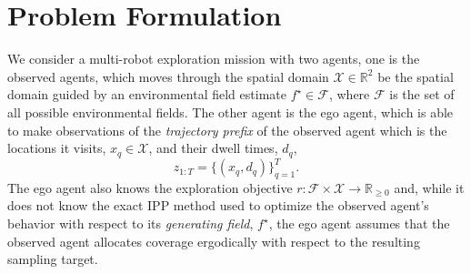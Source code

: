 \documentclass[letterpaper,10pt,conference]{ieeeconf}
\begin{document}

\section{Problem Formulation}

We consider a multi-robot exploration mission with two agents, one is the observed agents, which moves through the spatial domain $\mathcal X \in \mathbb{R}^2$ be the spatial domain guided by an environmental field estimate $f^\star\in\mathcal F$, where $\mathcal F$ is the set of all possible environmental fields.  The other agent is the ego agent, which is able to make observations of the \emph{trajectory prefix} of the observed agent which is the locations it visits, $x_q\in\mathcal X$, and their dwell times, $d_q$,
\begin{equation}
  z_{1:T}=\{(x_q,d_q)\}_{q=1}^{T}.
\end{equation}
The ego agent also knows the exploration objective $r:\mathcal F\times\mathcal X\rightarrow\mathbb R_{\geq0}$ and, while it does not know the exact IPP method used to optimize the observed agent's behavior with respect to its \emph{generating field}, $f^\star$, the ego agent assumes that the observed agent allocates coverage ergodically with respect to the resulting sampling target. 
\end{document}
